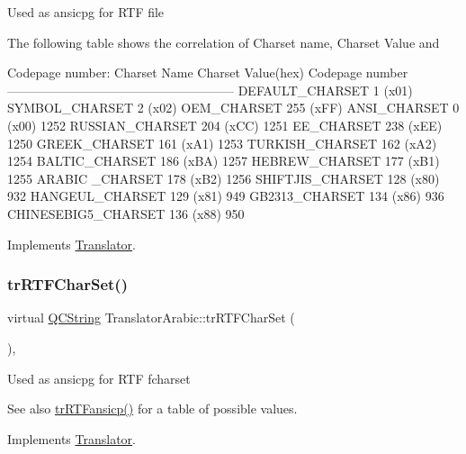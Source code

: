 Used as ansicpg for R\+TF file

The following table shows the correlation of Charset name, Charset Value and 
\begin{DoxyPre}
Codepage number:
Charset Name       Charset Value(hex)  Codepage number
------------------------------------------------------
DEFAULT\_CHARSET           1 (x01)
SYMBOL\_CHARSET            2 (x02)
OEM\_CHARSET             255 (xFF)
ANSI\_CHARSET              0 (x00)            1252
RUSSIAN\_CHARSET         204 (xCC)            1251
EE\_CHARSET              238 (xEE)            1250
GREEK\_CHARSET           161 (xA1)            1253
TURKISH\_CHARSET         162 (xA2)            1254
BALTIC\_CHARSET          186 (xBA)            1257
HEBREW\_CHARSET          177 (xB1)            1255
ARABIC \_CHARSET         178 (xB2)            1256
SHIFTJIS\_CHARSET        128 (x80)             932
HANGEUL\_CHARSET         129 (x81)             949
GB2313\_CHARSET          134 (x86)             936
CHINESEBIG5\_CHARSET     136 (x88)             950
\end{DoxyPre}
 

Implements \mbox{\hyperlink{class_translator_a9953a4c0e6a4fc7d017abcd5c2939e0f}{Translator}}.

\mbox{\label{class_translator_arabic_a2d31627bc9d5ab47da2d88e210a17b32}} 
\subsubsection{\texorpdfstring{trRTFCharSet()}{trRTFCharSet()}}
{\footnotesize\ttfamily virtual \mbox{\hyperlink{class_q_c_string}{Q\+C\+String}} Translator\+Arabic\+::tr\+R\+T\+F\+Char\+Set (\begin{DoxyParamCaption}{ }\end{DoxyParamCaption})\hspace{0.3cm}{\ttfamily [inline]}, {\ttfamily [virtual]}}

Used as ansicpg for R\+TF fcharset \begin{DoxySeeAlso}{See also}
\mbox{\hyperlink{class_translator_arabic_aa85b5114f22f96945211a76b143bc067}{tr\+R\+T\+Fansicp()}} for a table of possible values. 
\end{DoxySeeAlso}


Implements \mbox{\hyperlink{class_translator_afad391f3cbfb5ce6332b7239f8e2049a}{Translator}}.

